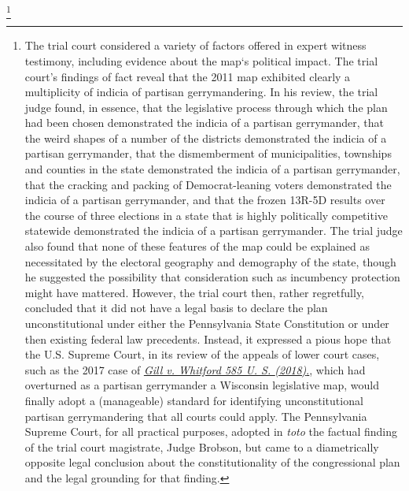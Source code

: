         \footnote{The trial court considered a variety of factors offered in expert witness testimony, including evidence about the map‘s political impact. The trial court’s findings of fact reveal that the 2011 map exhibited clearly a multiplicity of indicia of partisan gerrymandering. In his review, the trial judge found, in essence, that the legislative process through which the plan had been chosen demonstrated the indicia of a partisan gerrymander, that the weird shapes of a number of the districts demonstrated the indicia of a partisan gerrymander, that the dismemberment of municipalities, townships and counties in the state demonstrated the indicia of a partisan gerrymander, that the cracking and packing of Democrat-leaning voters demonstrated the indicia of a partisan gerrymander, and that the frozen 13R-5D results over the course of three elections in a state that is highly politically competitive statewide demonstrated the indicia of a partisan gerrymander. The trial judge also found that none of these features of the map could be explained as necessitated by the electoral geography and demography of the state, though he suggested the possibility that consideration such as incumbency protection might have mattered. However, the trial court then, rather regretfully, concluded that it did not have a legal basis to declare the plan unconstitutional under either the Pennsylvania State Constitution or under then existing federal law precedents. Instead, it expressed a pious hope that the U.S. Supreme Court, in its review of the appeals of lower court cases, such as the 2017 case of \href{https://www.brennancenter.org/sites/default/files/legal-work/16-1161_Opinion.pdf}{\textit{Gill v. Whitford 585 U. S. \underline{\hspace{3em}} (2018)}.}, which had overturned as a partisan gerrymander a Wisconsin legislative map, would finally adopt a (manageable) standard for identifying unconstitutional partisan gerrymandering that all courts could apply. The Pennsylvania Supreme Court, for all practical purposes, adopted in \textit{toto} the factual finding of the trial court magistrate, Judge Brobson, but came to a diametrically opposite legal conclusion about the constitutionality of the congressional plan and the legal grounding for that finding.}
\par
